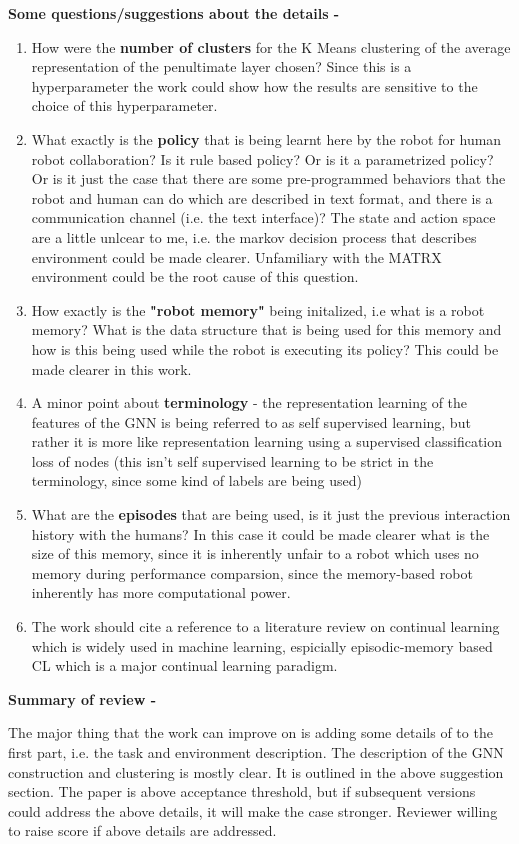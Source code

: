\documentclass[letterpaper]{article} %
\begin{document}
\textbf{Some questions/suggestions about the details -}
\begin{enumerate}
\item How were the \textbf{number of clusters} for the K Means clustering of the average representation of the penultimate layer chosen? Since this is a hyperparameter the work could show how the results are sensitive to the choice of this hyperparameter.
\item What exactly is the \textbf{policy} that is being learnt here by the robot for human robot collaboration? Is it rule based policy? Or is it a parametrized policy? Or is it just the case that there are some pre-programmed behaviors that the robot and human can do which are described in text format, and there is a communication channel (i.e. the text interface)? The state and action space are a little unlcear to me, i.e. the markov decision process that describes environment could be made clearer. Unfamiliary with the MATRX environment could be the root cause of this question.
\item How exactly is the \textbf{"robot memory"} being initalized, i.e what is a robot memory? What is the data structure that is being used for this memory and how is this being used while the robot is executing its policy? This could be made clearer in this work.
\item A minor point about \textbf{terminology} - the representation learning of the features of the GNN is being referred to as self supervised learning, but rather it is more like representation learning using a supervised classification loss of nodes (this isn't self supervised learning to be strict in the terminology, since some kind of labels are being used)
\item What are the \textbf{episodes} that are being used, is it just the previous interaction history with the humans? In this case it could be made clearer what is the size of this memory, since it is inherently unfair to a robot which uses no memory during performance comparsion, since the memory-based robot inherently has more computational power.
\item The work should cite a reference to a literature review on continual learning which is widely used in machine learning, espicially episodic-memory based CL which is a major continual learning paradigm.
\end{enumerate}

\textbf{Summary of review -}

The major thing that the work can improve on is adding some details of to the first part, i.e. the task and environment description. The description of the GNN construction and clustering is mostly clear. It is outlined in the above suggestion section. The paper is above acceptance threshold, but if subsequent versions could address the above details, it will make the case stronger. Reviewer willing to raise score if above details are addressed.
\end{document}
